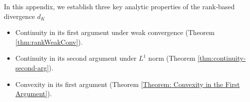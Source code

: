 \documentclass{article}
\begin{document}

In this appendix, we establish three key analytic properties of the rank‐based divergence \(d_K\)
\begin{itemize}
  \item Continuity in its first argument under weak convergence (Theorem \ref{thm:rankWeakConv}).
  \item Continuity in its second argument under \(L^1\) norm (Theorem \ref{thm:continuity-second-arg}).
  \item Convexity in its first argument (Theorem \ref{Theorem: Convexity in the First Argument}).
\end{itemize}
\end{document}
